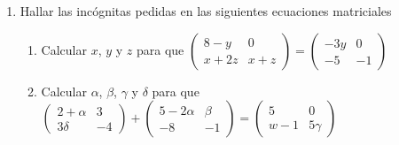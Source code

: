 \documentclass[a4paper]{article}
\newcommand{\exercise}{\item}
\begin{document}
\begin{enumerate}
	\begin{multicols}{3}
	\begin{enumerate} [label=(\alph*)]
		\item $A.B$
		\item $A^T.B^T$
		\item $B^T.A^T$
		\item $(A.B)^T$
		\item $B^2$
		\item $B^3$
		\item $A.B^2$
		\item $2A+B$
		\item $B.A+B$
		\item $B^2-A^T.A$
		\item $A^3-A.E$
		\item $E^T-2E^2$
		\item $5A-E.(A^T)^T$
		\item $A.D+C^T$
		\item $C.D$
		\item $D.C$
		\item $E.D-D$
		\item $C.E+C$
	\end{enumerate}
	\end{multicols}
	\exercise Hallar las incógnitas pedidas en las siguientes ecuaciones matriciales
	\begin{enumerate} [label=(\alph*)]
		\item Calcular $x$, $y$ y $z$ para que $\left(\begin{matrix} 8-y & 0 \\ x+2z & x+z \end{matrix}\right)=\left(\begin{matrix} -3y & 0 \\ -5 & -1 \end{matrix}\right)$
		\item Calcular $\alpha$, $\beta$, $\gamma$ y $\delta$ para que $\left(\begin{matrix} 2+\alpha & 3 \\ 3\delta & -4 \end{matrix}\right) + \left(\begin{matrix} 5-2\alpha & \beta \\ -8 & -1 \end{matrix}\right)=\left(\begin{matrix} 5 & 0 \\ w-1 & 5\gamma \end{matrix}\right)$

\end{enumerate}
\end{enumerate}
\end{document}
